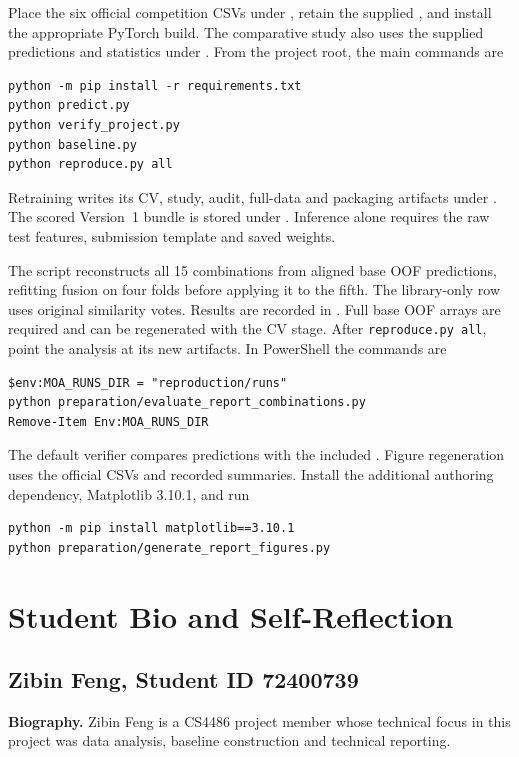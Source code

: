 \documentclass[journal]{IEEEtran}
\begin{document}
Place the six official competition CSVs under , retain the supplied , and install the appropriate PyTorch build. The comparative study also uses the supplied predictions and statistics under . From the project root, the main commands are
\begin{verbatim}
python -m pip install -r requirements.txt
python predict.py
python verify_project.py
python baseline.py
python reproduce.py all
\end{verbatim}
Retraining writes its CV, study, audit, full-data and packaging artifacts under . The scored Version~1 bundle is stored under . Inference alone requires the raw test features, submission template and saved weights.

The script  reconstructs all 15 combinations from aligned base OOF predictions, refitting fusion on four folds before applying it to the fifth. The library-only row uses original similarity votes. Results are recorded in . Full base OOF arrays are required and can be regenerated with the CV stage. After \texttt{reproduce.py all}, point the analysis at its new artifacts. In PowerShell the commands are
\begingroup\small
\begin{verbatim}
$env:MOA_RUNS_DIR = "reproduction/runs"
python preparation/evaluate_report_combinations.py
Remove-Item Env:MOA_RUNS_DIR
\end{verbatim}
\endgroup
The default verifier compares predictions with the included . Figure regeneration uses the official CSVs and recorded summaries. Install the additional authoring dependency, Matplotlib 3.10.1, and run
\begingroup\small
\begin{verbatim}
python -m pip install matplotlib==3.10.1
python preparation/generate_report_figures.py
\end{verbatim}
\endgroup

\section{Student Bio and Self-Reflection}
\label{sec:bio}

\subsection{Zibin Feng, Student ID 72400739}
\textbf{Biography.} Zibin Feng is a CS4486 project member whose technical focus in this project was data analysis, baseline construction and technical reporting.
\end{document}
